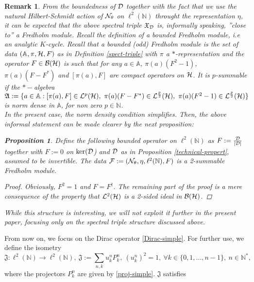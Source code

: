 \documentclass[a4paper]{jpconf}
\numberwithin{equation}{section}
\newtheorem{proposition}[Theorem]{Proposition}
\newtheorem{remark}[Theorem]{Remark}
\theoremstyle{nonumberplain}
\newtheorem{proof}{Proof}
\begin{document}
\begin{remark}
From the boundedness of ${\cal{D}}$ together with the fact that we use the natural Hilbert-Schmidt action of ${\cal{N}}_\theta$ on $\ell^2(\mathbb{N})$ throught the representation $\eta$, it can be expected that the above spectral triple $\mathfrak{X}_{{\cal{D}}}$ is, informally speaking,  ''close to'' a Fredholm module. Recall the definition of a bounded Fredholm module, i.e an analytic $K$-cycle. Recall that a bounded (odd) Fredholm module is the set of data $(\mathbb{A},\pi,{\cal{H}},F)$ as in Definition \ref{spect-triple} with $\pi$ a $*$-representation and the operator $F\in{\cal{B}}({\cal{H}})$ is such that for any $a\in\mathbb{A}$, $\pi(a)(F^2-1)$, $\pi(a)(F-F^*)$ and $[\pi(a),F]$ are compact operators on ${\cal{H}}$. It is $p$-summable if the $*-$algebra $\mathfrak{A}:=\{a\in\mathbb{A}: [\pi(a),F]\in{\cal{L}}^p({\cal{H}}),\ \pi(a)(F-F^*)\in{\cal{L}}^{\frac{p}{2}}({\cal{H}}),\ \pi(a)(F^2-1)\in{\cal{L}}^{\frac{p}{2}}({\cal{H}})\}$ is norm dense in $\mathbb{A}$, for non zero $p\in\mathbb{N}$.\\
In the present case, the norm density condition simplifies. Then, the above informal statement can be made clearer by the next proposition:
\begin{proposition}
Define the following bounded operator on $\ell^2(\mathbb{N})$ as $F:=\frac{{\cal{D}}}{|{\cal{D}}|}$ together with $F:=0$ on $\ker({\cal{D}}$) and ${\cal{D}}$ as in Proposition \ref{technical-propert}, assumed to be invertible. The data ${\cal{F}}:=({\cal{N}}_\theta,\eta,\ell^2(\mathbb{N}), F)$ is a 2-summable Fredholm module.
\end{proposition}
\begin{proof}
Obviously, $F^2=1$ and $F=F^\dag$. The remaining part of the proof is a mere consequence of the property that ${\cal{L}}^2({\cal{H}})$ is a 2-sided ideal in ${\cal{B}}({\cal{H}})$.
\end{proof}
While this structure is interesting, we will not exploit it further in the present paper, focusing only on the spectral triple structure discussed above. 
\end{remark}
From now on, we focus on the Dirac operator \eqref{Dirac-simple}. For further use, we define the isometry
\begin{equation}
\mathfrak{J}:\ell^2(\mathbb{N})\to\ell^2(\mathbb{N}),\ \mathfrak{J}:=\sum_{n,k}u^n_kP^n_k,\ (u^n_k)^2=1,\ \forall k\in\{0,1,...,n-1\},\ n\in\mathbb{N}^*\label{isomet-basic},
\end{equation}
where the projectors $P^n_k$ are given by \eqref{proj-simple}. $\mathfrak{J}$ satisfies
\end{document}
